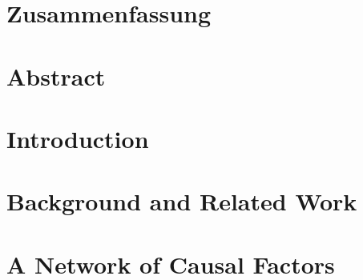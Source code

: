 \documentclass [
     12pt,         %
     a4paper,      %
     BCOR10mm,     %
     DIV14,        %
     liststotoc,   %
     bibtotoc,     %
     idxtotoc,     %
     parskip       %
     ]{scrreprt}
\begin{document}




\chapter*{Zusammenfassung}

\newpage

\chapter*{Abstract}

\newpage


\tableofcontents
\cleardoublepage
{} 




\chapter{Introduction}\label{introduction}



\newpage


\chapter{Background and Related Work} \label{background}



\newpage


\chapter{A Network of Causal Factors} \label{conceptualization}


\end{document}
